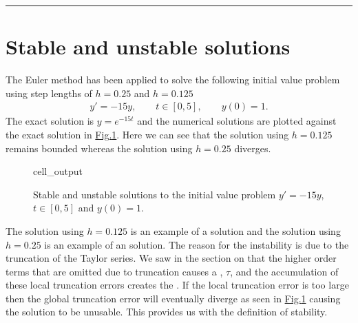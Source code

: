 \documentclass[letterpaper,10pt,english]{jupyterBook}
\begin{document}
\bigskip\hrule\bigskip



\section{Stable and unstable solutions}
\label{\detokenize{4_Stability/4.0_Stability:stable-and-unstable-solutions}}
\sphinxAtStartPar
The Euler method has been applied to solve the following initial value problem using step lengths of \(h = 0.25\) and \(h = 0.125\)
\begin{align*}
    y' = -15y, \qquad t \in [0, 5], \qquad y(0) = 1.
\end{align*}
\sphinxAtStartPar
The exact solution is \(y = e^{-15t}\) and the numerical solutions are plotted against the exact solution in \hyperref[\detokenize{4_Stability/4.0_Stability:stiff-solution-1}]{Fig.\@ \ref{\detokenize{4_Stability/4.0_Stability:stiff-solution-1}}}. Here we can see that the solution using \(h = 0.125\) remains bounded whereas the solution using \(h = 0.25\) diverges.

\begin{figure}[htbp]
\centering
\capstart
\begin{sphinxVerbatimOutput}

\begin{sphinxuseclass}{cell_output}
\noindent{}

\end{sphinxuseclass}\end{sphinxVerbatimOutput}
\caption{Stable and unstable solutions to the initial value problem \(y' = -15y\), \(t\in [0, 5]\) and \(y(0) = 1\).}\label{\detokenize{4_Stability/4.0_Stability:stiff-solution-1}}\end{figure}

\sphinxAtStartPar
The solution using \(h = 0.125\) is an example of a  solution and the solution using \(h = 0.25\) is an example of an  solution. The reason for the instability is due to the truncation of the Taylor series. We saw in the section on {\hyperref[\detokenize{1_IVPs/1.3_Error_Analysis:error-analysis-section}]{}} that the higher order terms that are omitted due to truncation causes a {\hyperref[\detokenize{1_IVPs/1.3_Error_Analysis:lte-definition}]{}}, \(\tau\), and the accumulation of these local truncation errors creates the {\hyperref[\detokenize{1_IVPs/1.3_Error_Analysis:gte-definition}]{}}. If the local truncation error is too large then the global truncation error will eventually diverge as seen in \hyperref[\detokenize{4_Stability/4.0_Stability:stiff-solution-1}]{Fig.\@ \ref{\detokenize{4_Stability/4.0_Stability:stiff-solution-1}}} causing the solution to be unusable. This provides us with the definition of stability.
\end{document}
